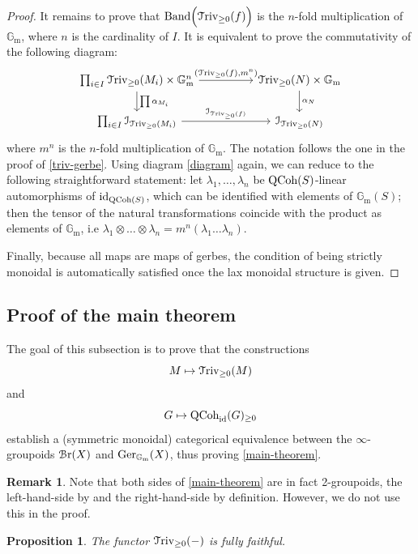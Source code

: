 \documentclass[11pt, twoside]{article} %
\numberwithin{equation}{section}
\theoremstyle{plain}
\newtheorem{prop}[thm]{Proposition}
\theoremstyle{definition}
\newtheorem{rem}[thm]{Remark}
\newcommand{\Gm}{\mathbb G_{\mathrm{m}}}
\newcommand{\id}{\textup{id}}
\newcommand{\QCoh}{\textup{QCoh}}
\newcommand{\Triv}{\mathcal{T}\textup{riv}}
\newcommand{\cBr}{\mathcal{B}\textup{r}}
\newcommand{\Ger}{\textup{Ger}}
\begin{document}
\begin{proof}
It remains to prove that $\textup{Band}\Big(\Triv_{\geq 0}(f)\Big)$ is the $n$-fold multiplication of $\Gm$, where $n$ is the cardinality of $I$. It is equivalent to prove the commutativity of the following diagram:
$$\begin{tikzcd}
\prod_{i \in I}\Triv_{\geq 0}(M_i) \times \Gm^n \arrow[rr, "{(\Triv_{\geq 0}(f), m^n)}"] \arrow[d, "\prod \alpha_{M_i}"] &  & \Triv_{\geq 0}(N) \times \Gm \arrow[d, "\alpha_N"] \\
\prod_{i \in I} \mathcal{I}_{\Triv_{\geq 0}(M_i)} \arrow[rr, "\mathcal{I}_{\Triv_{\geq 0}(f)}"]                         &  & \mathcal{I}_{\Triv_{\geq 0}(N)}
\end{tikzcd}$$
where $m^n$	is the $n$-fold multiplication of $\Gm$. The notation follows the one in the proof of \cref{triv-gerbe}. Using diagram \ref{diagram} again, we can reduce to the following straightforward statement: let $\lambda_1,\dots,\lambda_n$ be $\QCoh(S)$-linear automorphisms of $\id_{\QCoh(S)}$, which can be identified with elements of $\Gm(S)$; then the tensor of the natural transformations coincide with the product as elements of $\Gm$, i.e $\lambda_1 \otimes \dots \otimes \lambda_n = m^n(\lambda_1\dots\lambda_n)$. 

Finally, because all maps are maps of gerbes, the condition of being strictly monoidal is automatically satisfied once the lax monoidal structure is given.
\end{proof}
	
	\subsection{Proof of the main theorem}\label{section-equivalence}
	The goal of this subsection is to prove that the constructions $$M \mapsto \Triv_{\geq 0}(M)$$
	and
	$$G\mapsto \QCoh_{\id}(G)_{\geq 0}$$
	establish a (symmetric monoidal) categorical equivalence between the $\infty$-groupoids $\cBr(X)$ and $\Ger_{\Gm}(X)$, thus proving \cref{main-theorem}.
 \begin{rem}\label{2-groupoids}Note that both sides of \cref{main-theorem} are in fact 2-groupoids, the left-hand-side by \cite[Construction 11.5.7.13]{SAG} and the right-hand-side by definition. However, we do not use this in the proof.\end{rem}
	
	
	
	\begin{prop}\label{Triv-is-ff}The functor $\Triv_{\geq 0}(-)$ is fully faithful.\end{prop}
	
\end{document}
